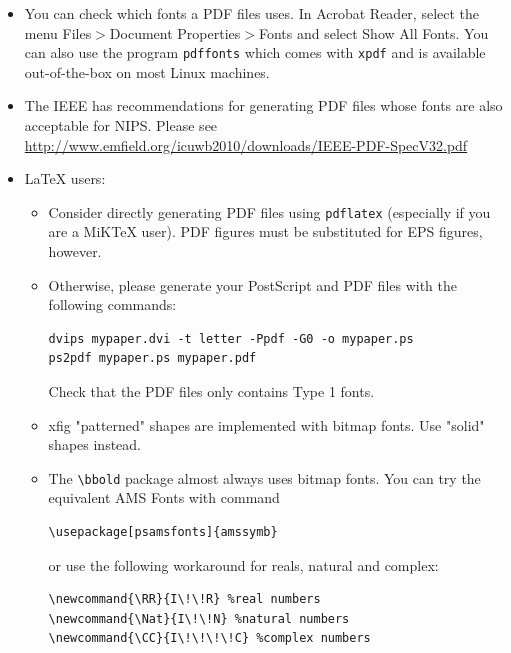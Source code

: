 \documentclass{article} %
\begin{document}
\begin{itemize}

\item You can check which fonts a PDF files uses.  In Acrobat Reader,
select the menu Files$>$Document Properties$>$Fonts and select Show All Fonts. You can
also use the program \verb+pdffonts+ which comes with \verb+xpdf+ and is
available out-of-the-box on most Linux machines.

\item The IEEE has recommendations for generating PDF files whose fonts
are also acceptable for NIPS. Please see
\url{http://www.emfield.org/icuwb2010/downloads/IEEE-PDF-SpecV32.pdf}

\item LaTeX users:

\begin{itemize}

\item Consider directly generating PDF files using \verb+pdflatex+
(especially if you are a MiKTeX user). 
PDF figures must be substituted for EPS figures, however.

\item Otherwise, please generate your PostScript and PDF files with the following commands:
\begin{verbatim} 
dvips mypaper.dvi -t letter -Ppdf -G0 -o mypaper.ps
ps2pdf mypaper.ps mypaper.pdf
\end{verbatim}

Check that the PDF files only contains Type 1 fonts. 

\item xfig "patterned" shapes are implemented with 
bitmap fonts.  Use "solid" shapes instead. 
\item The \verb+\bbold+ package almost always uses bitmap
fonts.  You can try the equivalent AMS Fonts with command
\begin{verbatim}
\usepackage[psamsfonts]{amssymb}
\end{verbatim}
 or use the following workaround for reals, natural and complex: 
\begin{verbatim}
\newcommand{\RR}{I\!\!R} %real numbers
\newcommand{\Nat}{I\!\!N} %natural numbers 
\newcommand{\CC}{I\!\!\!\!C} %complex numbers
\end{verbatim}


\end{itemize}
\end{itemize}
\end{document}
